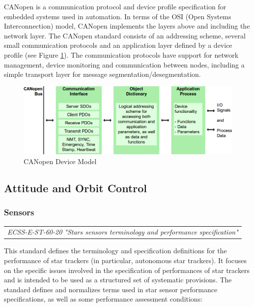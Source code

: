 CANopen is a communication protocol and device profile specification for embedded systems used in automation. In terms of the OSI (Open Systems Interconnection) model, CANopen implements the layers above and including the network layer. The CANopen standard consists of an addressing scheme, several small communication protocols and an application layer defined by a device profile (see Figure \ref{fig:CANopen Device Model}). The communication protocols have support for network management, device monitoring and communication between nodes, including a simple transport layer for message segmentation/desegmentation.

\begin{figure}[h]
\centering\includegraphics[scale=0.4]{fig/canopen_device_model}
\caption{CANopen Device Model}
\label{fig:CANopen Device Model}
\end{figure}


\subsection{Attitude and Orbit Control}

\subsubsection{Sensors}

\begin{tabular}{l}
\textit{ECSS-E-ST-60-20 "Stars sensors terminology and performance specification" \cite{ECSS-E-ST-60-20}} \\
\end{tabular}

This standard defines the terminology and specification definitions for the performance of star trackers (in particular, autonomous star trackers). It focuses on the specific issues involved in the specification of performances of star trackers and is intended to be used as a structured set of systematic provisions. The standard defines and normalizes terms used in star sensor performance specifications, as well as some performance assessment conditions:

